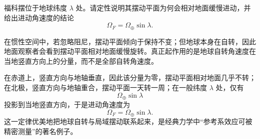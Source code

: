 \begin{problem}
福科摆位于地球纬度 $\lambda$ 处。请定性说明其摆动平面为何会相对地面缓慢进动，并给出进动角速度的结论
\[
\Omega_F=\Omega_\oplus\sin\lambda.
\]
\begin{solution}
在惯性空间中，若忽略阻尼，摆动平面倾向于保持不变；但地球本身在自转，因此地面观察者会看到摆动平面相对地面缓慢旋转。真正起作用的是地球自转角速度在当地竖直方向上的分量，而不是全部自转角速度。

在赤道上，竖直方向与地轴垂直，因此该分量为零，摆动平面相对地面几乎不转；在北极，竖直方向与地轴重合，摆动平面一天转一周；在一般纬度 $\lambda$ 处，仅有
\[
\Omega_\oplus\sin\lambda
\]
投影到当地竖直方向，于是进动角速度为
\[
\Omega_F=\Omega_\oplus\sin\lambda.
\]
这一定律优美地把地球自转与局域摆动联系起来，是经典力学中“参考系效应可被精密测量”的著名例子。
\end{solution}
\end{problem}
